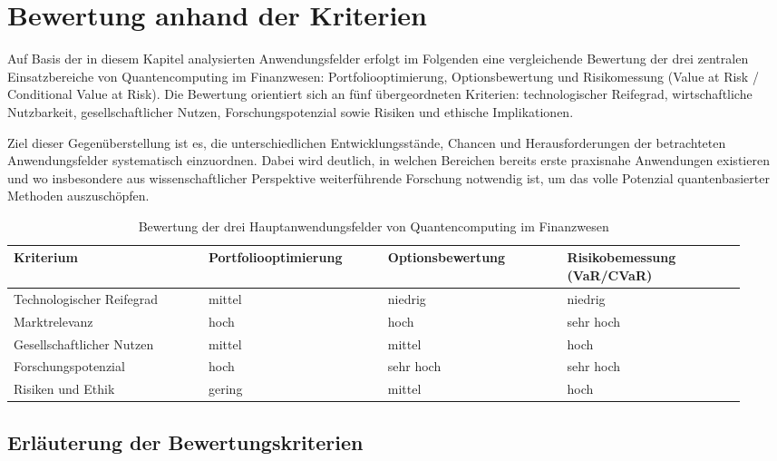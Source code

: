\section{Bewertung anhand der Kriterien}

Auf Basis der in diesem Kapitel analysierten Anwendungsfelder erfolgt im Folgenden eine vergleichende Bewertung der drei zentralen Einsatzbereiche von Quantencomputing im Finanzwesen: Portfoliooptimierung, Optionsbewertung und Risikomessung (Value at Risk / Conditional Value at Risk). Die Bewertung orientiert sich an fünf übergeordneten Kriterien: technologischer Reifegrad, wirtschaftliche Nutzbarkeit, gesellschaftlicher Nutzen, Forschungspotenzial sowie Risiken und ethische Implikationen.

Ziel dieser Gegenüberstellung ist es, die unterschiedlichen Entwicklungsstände, Chancen und Herausforderungen der betrachteten Anwendungsfelder systematisch einzuordnen. Dabei wird deutlich, in welchen Bereichen bereits erste praxisnahe Anwendungen existieren und wo insbesondere aus wissenschaftlicher Perspektive weiterführende Forschung notwendig ist, um das volle Potenzial quantenbasierter Methoden auszuschöpfen.



\begin{table}[!htbp]
\centering
\renewcommand{\arraystretch}{1.5}
\begin{tabular}{|p{0.25\linewidth}|p{0.23\linewidth}|p{0.23\linewidth}|p{0.23\linewidth}|}
\hline
\textbf{Kriterium} & \textbf{Portfoliooptimierung} & \textbf{Optionsbewertung} & \textbf{Risikobemessung (VaR/CVaR)} \\
\hline
Technologischer Reifegrad & mittel & niedrig & niedrig \\
\hline
Marktrelevanz & hoch & hoch & sehr hoch \\
\hline
Gesellschaftlicher Nutzen & mittel & mittel & hoch \\
\hline
Forschungspotenzial & hoch & sehr hoch & sehr hoch \\
\hline
Risiken und Ethik & gering & mittel & hoch \\
\hline
\end{tabular}
\caption{Bewertung der drei Hauptanwendungsfelder von Quantencomputing im Finanzwesen}
\label{tab:anwendungsbewertung}
\end{table}


\subsection*{Erläuterung der Bewertungskriterien}

